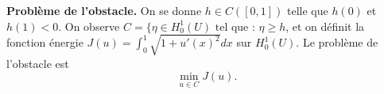 \textbf{Problème de l'obstacle.} On se donne $h\in C([0,1])$ telle que $h(0)$ et $h(1)<0$. On observe $C = \{ \eta\in H_0^1(U) \text{ tel que : }\eta \geq h $, et on définit la fonction énergie $J(u)=\int_0^1 \sqrt{1+u'(x)^2} dx$ sur $H_0^1(U)$. Le problème de l'obstacle est 
\[\min_{u\in C} J(u).\]
 



